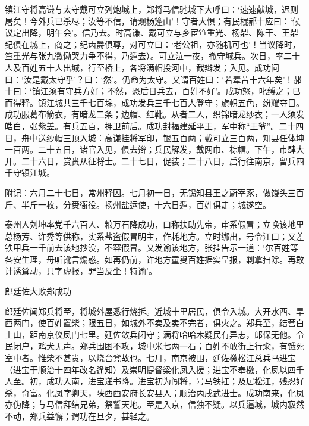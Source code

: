 \documentclass[]{article}
\begin{document}
镇江守将高谦与太守戴可立列炮城上，郑将马信驰城下大呼曰：`速速献城，迟则屠矣！今外兵已杀尽；汝等不信，请观杨篷山'！守者大惧；有民棍郝十应曰：`候议定出降，明午会'。信乃去。时高谦、戴可立与乡宦笪重光、杨鼎、陈干、王鼎纪俱在城上，商之；纪齿爵俱尊，对可立曰：`老公祖，亦随机可也'！当议降时，笪重光与张九微恸哭力争不得，乃遁去）。可立泣一夜，撤守城兵。次日，率二十人及百姓五十人出城，行至桥上，各将满帽投河中，截辫发；入见。成功问曰：`汝是戴太守乎'？曰：`然'。仍命为太守。又谓百姓曰：`若辈苦十六年矣'！郝十曰：`镇江须有守兵方好；不然，恐后日兵去，百姓不好'。成功怒，叱缚之；已而得释。镇江城共三千七百垛，成功发兵三千七百人登守；旗帜五色，纷耀夺目。成功服葛布箭衣，有暗龙二条；边帽、红靴。从者二人，织锦暗龙纱衣；一人须发皓白，张紫盖。有兵五百，拥卫前后。成功封福建延平王，军中称``王爷''。二十四日，舟中送纱帽三顶入城：高谦挂将军印，银五百两；戴可立三百两，知县任体坤一百两。二十五日，诸官入见，俱去辫；兵民解发，戴网巾、棕帽。下午，市肆大开。二十六日，赏赉从征将士。二十七日，促装；二十八日，启行往南京，留兵四千守镇江城。

附记：六月二十七日，常州释囚。七月初一日，无锡知县王之蔚宰豕，做馒头三百斤、半斤一枚，分赉衙役。扬州盐运使，十六日遁，百姓俱走；城遂空。

泰州人刘坤率党千六百人、粮万石降成功，口称扶助先帝，审系假冒；立唤该地里总杨芳、许秀等供称，实系盐盗假冒明主，作耗地方。立时绑出，号令江口；又差铁甲兵一千前去该地抄没，不容假冒。又发谕该地方，张挂告示一道：`尔百姓等各安生理，毋听讹言煽惑。如再仍前，许地方童叟百姓据实呈报，剿拿扫除。再敢计诱耸动，只字虚报，罪当反坐！特谕'。

郎廷佐大败郑成功

郎廷佐闻郑兵将至，将城外屋悉行烧拆。近城十里居民，俱令入城。大开水西、旱西两门，使百姓置柴；限五日，如城外不卖及卖不完者，俱火之。郑兵至，结营白土山，距南京仪凤门七里。廷佐敛兵闭守；满将哈哈木疑民有异志，郎保无他。令民闭户，鸡犬无声。郑兵围困不攻，城中米七两一石；百姓不敢街上行籴，有饿死室中者。惟柴不甚贵，以烧台凳故也。七月，南京被围，廷佐檄松江总兵马进宝（进宝于顺治十四年改名逢知）及崇明提督梁化凤入援；进宝不奉檄，化凤以四千人至。初，成功入南，进宝递书降。进宝初为闯将，号马铁扛；及居松江，残忍好杀，奇富。化凤字卿天，陕西西安府长安县人；顺治丙戌武进士。成功南来，化凤亦伪降；与马信拜结兄弟，祭誓天地。至是入京，信独不疑。以兵逼城，城内寂然不动，郑兵益懈；谓功在旦夕，甚轻之。
\end{document}
